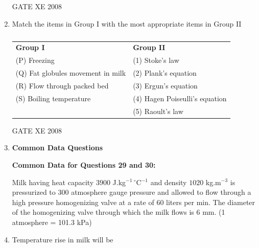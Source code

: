 \documentclass[12pt]{article}
\begin{document}
\begin{enumerate}[label=Q\arabic*.]
GATE XE 2008  

\item  Match the items in Group I with the most appropriate items in Group II  

\begin{table}[H]     \centering     \caption{}     \label{}     \begin{tabular}{p{7cm} p{7cm}}
\textbf{Group I} & \textbf{Group II} \\
(P) Freezing & (1) Stoke's law \\
(Q) Fat globules movement in milk & (2) Plank's equation \\
(R) Flow through packed bed & (3) Ergun's equation \\
(S) Boiling temperature & (4) Hagen Poiseulli's equation \\
& (5) Raoult's law \\
\end{tabular} \end{table}  

\begin{enumerate}[label=(\Alph*)]
\end{enumerate}
GATE XE 2008  

\item[] \textbf{\Large Common Data Questions}

\textbf{Common Data for Questions 29 and 30:} 

Milk having heat capacity $3900$ J.kg$^{-1} \, ^\circ$C$^{-1}$ and density $1020$ kg.m$^{-3}$ is pressurized to 300 atmosphere gauge pressure and allowed to flow through a high pressure homogenizing valve at a rate of 60 liters per min. The diameter of the homogenizing valve through which the milk flows is 6 mm. (1 atmosphere = 101.3 kPa)  

\item Temperature rise in milk will be  

\begin{enumerate}[label=(\Alph*)]
\end{enumerate}


\end{enumerate}
\end{document}

